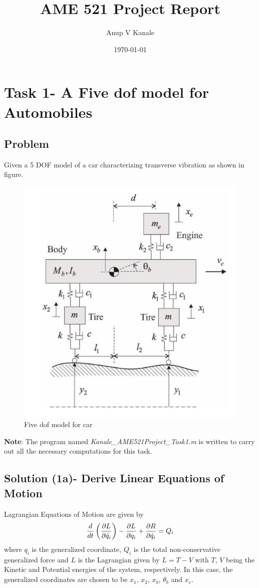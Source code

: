 \documentclass[11pt, oneside]{article}   	%
\title{AME 521 Project Report}
\author{Anup V Kanale}
\date{\today}							%
\begin{document}
\maketitle
\section{Task 1- A Five dof model for Automobiles}
\subsection{Problem}
Given a 5 DOF model of a car characterizing transverse vibration as shown in figure.

\begin{figure}[!htbp]
\centering
\includegraphics[scale=0.7]{CarModel}
\caption{Five dof model for car}
\end{figure}

\textbf{Note}: The program named \textit{Kanale\_AME521Project\_Task1.m} is written to carry out all the necessary computations for this task. 

\subsection{Solution (1a)- Derive Linear Equations of Motion}
Lagrangian Equations of Motion are given by
\begin{equation}
 \frac{d}{dt} \left( \pdv{L}{\dot{q}_i} \right) - \pdv{L}{q_i} + \pdv{R}{\dot{q}_i} = Q_i
\end{equation}
where $q_i$ is the generalized coordinate, $Q_i$ is the total non-conservative generalized force and $L$ is the Lagrangian given by $L=T-V$ with $T$, $V$ being the Kinetic and Potential energies of the system, respectively. In this case, the generalized coordinates are chosen to be $x_1$, $x_2$, $x_b$, $\theta_b$ and $x_e$.
\end{document}
